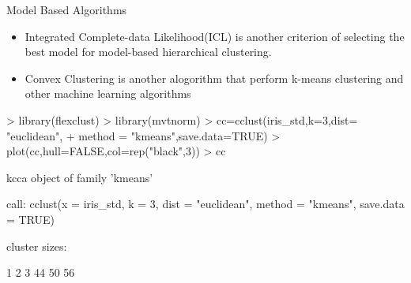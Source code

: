 \documentclass[10pt]{beamer}
\begin{document}
\begin{frame}[fragile]{Model Based Algorithms}
\begin{itemize}
\item Integrated Complete-data Likelihood(ICL) is another criterion of selecting the best model for model-based hierarchical clustering.
\item Convex Clustering is another alogorithm that perform k-means clustering and other machine learning algorithms
\end{itemize}
\begin{Schunk}
\begin{Sinput}
> library(flexclust)
> library(mvtnorm)
> cc=cclust(iris_std,k=3,dist= "euclidean", 
+           method = "kmeans",save.data=TRUE)
> plot(cc,hull=FALSE,col=rep("black",3))
> cc
\end{Sinput}
\begin{Soutput}
kcca object of family 'kmeans' 

call:
cclust(x = iris_std, k = 3, dist = "euclidean", method = "kmeans", 
    save.data = TRUE)

cluster sizes:

 1  2  3 
44 50 56 
\end{Soutput}
\end{Schunk}

\end{frame}
\end{document}
